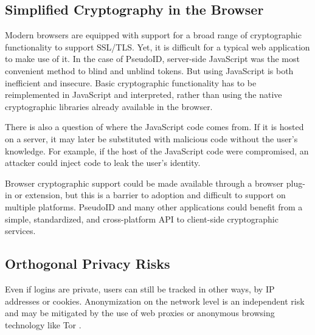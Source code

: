 \documentclass[11pt]{llncs}
\begin{document}
\subsection{Simplified Cryptography in the Browser}

Modern browsers are equipped with support for a broad range of
cryptographic functionality to support SSL/TLS. Yet, it is difficult
for a typical web application to make use of it. In the case of
PseudoID, server-side JavaScript was the most convenient method
to blind and unblind tokens. But using JavaScript is both inefficient
and insecure. Basic
cryptographic functionality has to be reimplemented in JavaScript and
interpreted, rather than using the native cryptographic libraries
already available in the browser.

There is also a question of where the JavaScript code comes from. If
it is hosted on a server, it may later be substituted with malicious
code without the user's knowledge. For example, if the host of the
JavaScript code were compromised, an attacker could inject code to
leak the user's identity.

Browser cryptographic support could be made available through
a browser plug-in or extension, but this is a barrier to adoption and
difficult to support on multiple platforms. PseudoID and many other
applications could benefit from a simple, standardized, and
cross-platform API to client-side cryptographic services.



\subsection{Orthogonal Privacy Risks}

Even if logins are private, users can still be tracked
in other ways, by IP addresses or cookies. Anonymization on the network
level is an
independent risk and may be mitigated by the use of web proxies or
anonymous browsing technology like Tor \cite{Tor}.
 
\end{document}
